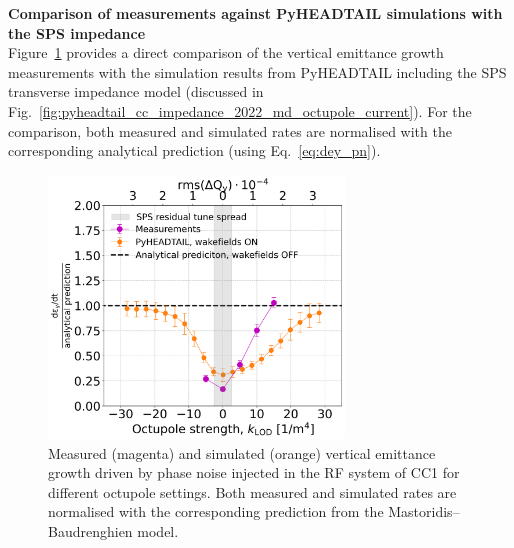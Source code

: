 \textbf{Comparison of measurements against PyHEADTAIL simulations with the SPS impedance}\\

Figure~\ref{fig:cc_md_2022_measurement_vs_pyheadtail_simualtion} provides a direct comparison of the vertical emittance growth measurements with the simulation results from PyHEADTAIL including the SPS transverse impedance model (discussed in Fig.~\ref{fig:pyheadtail_cc_impedance_2022_md_octupole_current}). For the comparison, both measured and simulated rates are normalised with the corresponding analytical prediction (using Eq.~\eqref{eq:dey_pn}). 

\begin{figure}[!h]
   \centering         
   \includegraphics[width=0.7\textwidth]{images/Ch8/deyRates_sps_270GeV_PN1e-8_400MHz_SPS_NewWakesAllcontributions_appendWakes_y-plane_WakesONvsOFF_QpxQpy1_6D_Nb5e5_intensity3e10Scan_simulations_vs_measurements_magenta_new_legend.png}
       \caption{Measured (magenta) and simulated (orange) vertical emittance growth driven by phase noise injected in the RF system of CC1 for different octupole settings. Both measured and simulated rates are normalised with the corresponding prediction from the Mastoridis--Baudrenghien model.}
       \label{fig:cc_md_2022_measurement_vs_pyheadtail_simualtion}
\end{figure}

